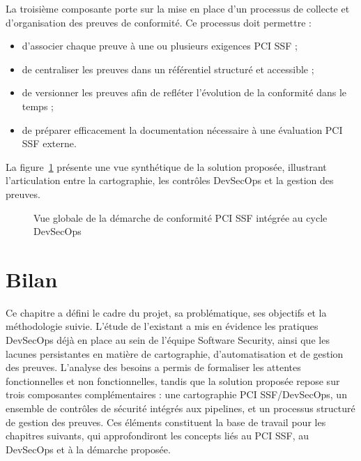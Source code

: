 La troisième composante porte sur la mise en place d'un processus de collecte et d'organisation des preuves de conformité. Ce processus doit permettre :

\begin{itemize}
    \item d'associer chaque preuve à une ou plusieurs exigences PCI SSF ;
    \item de centraliser les preuves dans un référentiel structuré et accessible ;
    \item de versionner les preuves afin de refléter l'évolution de la conformité dans le temps ;
    \item de préparer efficacement la documentation nécessaire à une évaluation PCI SSF externe.
\end{itemize}

La figure~\ref{fig:solution-globale} présente une vue synthétique de la solution proposée, illustrant l'articulation entre la cartographie, les contrôles DevSecOps et la gestion des preuves.

\begin{figure}[h!]
    \centering
    \caption{Vue globale de la démarche de conformité PCI SSF intégrée au cycle DevSecOps}
    \label{fig:solution-globale}
\end{figure}

\section{Bilan}

Ce chapitre a défini le cadre du projet, sa problématique, ses objectifs et la méthodologie suivie. L'étude de l'existant a mis en évidence les pratiques DevSecOps déjà en place au sein de l'équipe Software Security, ainsi que les lacunes persistantes en matière de cartographie, d'automatisation et de gestion des preuves. L'analyse des besoins a permis de formaliser les attentes fonctionnelles et non fonctionnelles, tandis que la solution proposée repose sur trois composantes complémentaires : une cartographie PCI SSF/DevSecOps, un ensemble de contrôles de sécurité intégrés aux pipelines, et un processus structuré de gestion des preuves. Ces éléments constituent la base de travail pour les chapitres suivants, qui approfondiront les concepts liés au PCI SSF, au DevSecOps et à la démarche proposée.

\clearpage
